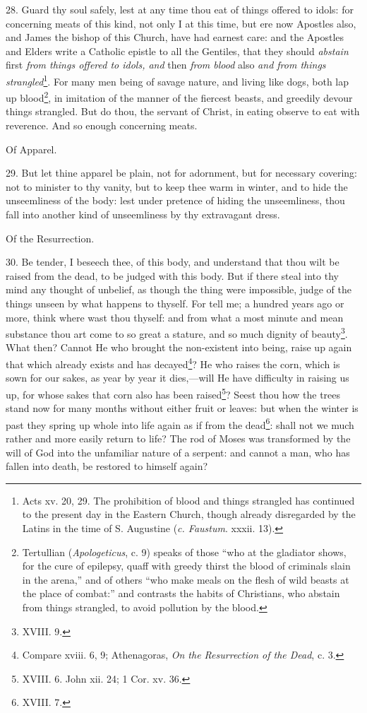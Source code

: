 28. Guard thy soul safely, lest at any time thou eat of things offered to idols: for concerning meats of this kind, not only I at this time, but ere now Apostles also, and James the bishop of this Church, have had earnest care: and the Apostles and Elders write a Catholic epistle to all the Gentiles, that they should \emph{abstain} first \emph{from things offered to idols, and} then \emph{from blood} also \emph{and from things strangled}\footnote{Acts xv. 20, 29. The prohibition of blood and things strangled has continued to the present day in the Eastern Church, though already disregarded by the Latins in the time of S. Augustine (\emph{c. Faustum}. xxxii. 13).}. For many men being of savage nature, and living like dogs, both lap up blood\footnote{Tertullian (\emph{Apologeticus}, c. 9) speaks of those “who at the gladiator shows, for the cure of epilepsy, quaff with greedy thirst the blood of criminals slain in the arena,” and of others “who make meals on the flesh of wild beasts at the place of combat:” and contrasts the habits of Christians, who abstain from things strangled, to avoid pollution by the blood.}, in imitation of the manner of the fiercest beasts, and greedily devour things strangled. But do thou, the servant of Christ, in eating observe to eat with reverence. And so enough concerning meats.

Of Apparel.

29. But let thine apparel be plain, not for adornment, but for necessary covering: not to minister to thy vanity, but to keep thee warm in winter, and to hide the unseemliness of the body: lest under pretence of hiding the unseemliness, thou fall into another kind of unseemliness by thy extravagant dress.

Of the Resurrection.

30. Be tender, I beseech thee, of this body, and understand that thou wilt be raised from the dead, to be judged with this body. But if there steal into thy mind any thought of unbelief, as though the thing were impossible, judge of the things unseen by what happens to thyself. For tell me; a hundred years ago or more, think where wast thou thyself: and from what a most minute and mean substance thou art come to so great a stature, and so much dignity of beauty\footnote{XVIII. 9.}. What then? Cannot He who brought the non-existent into being, raise up again that which already exists and has decayed\footnote{Compare xviii. 6, 9; Athenagoras, \emph{On the Resurrection of the Dead}, c. 3.}? He who raises the corn, which is sown for our sakes, as year by year it dies,—will He have difficulty in raising us up, for whose sakes that corn also has been raised\footnote{XVIII. 6. John xii. 24; 1 Cor. xv. 36.}? Seest thou how the trees stand now for many months without either fruit or leaves: but when the winter is past they spring up whole into life again as if from the dead\footnote{XVIII. 7.}: shall not we much rather and more easily return to life? The rod of Moses was transformed by the will of God into the unfamiliar nature of a serpent: and cannot a man, who has fallen into death, be restored to himself again?

